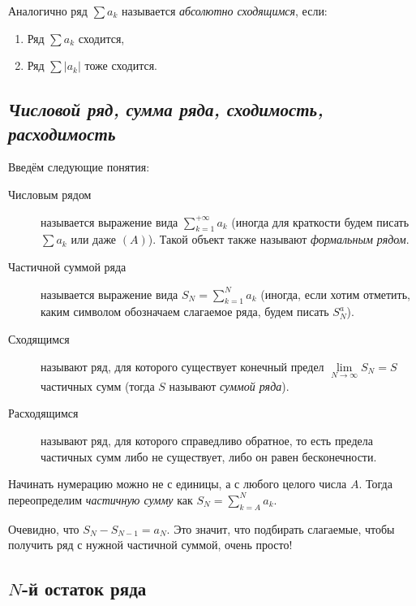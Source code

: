 \begin{ndefinition}
	Аналогично ряд \(\sum a_k\) называется \textit{абсолютно сходящимся}, если:
	\begin{enumerate}
		\item Ряд \(\sum a_k\) сходится,
		\item Ряд \(\sum |a_k|\) тоже сходится.
	\end{enumerate}
\end{ndefinition}

\subsection{\itshape Числовой ряд, сумма ряда, сходимость, расходимость}

\begin{definition}
	Введём следующие понятия:
	\begin{description}
		\item[Числовым рядом] называется выражение вида \(\sum\limits_{k=1}^{+\infty} a_k\) (иногда для краткости будем писать \(\sum a_k\) или даже \((A)\)). Такой объект также называют \textit{формальным рядом}.
		\item[Частичной суммой ряда] называется выражение вида \(S_N = \sum\limits_{k=1}^{N} a_k\) (иногда, если хотим отметить, каким символом обозначаем слагаемое ряда, будем писать \(S_N^a\)).
		\item[Сходящимся] называют ряд, для которого существует конечный предел \(\lim\limits_{N \to \infty} S_N = S\) частичных сумм (тогда \(S\) называют \textit{суммой ряда}).
		\item[Расходящимся] называют ряд, для которого справедливо обратное, то есть предела частичных сумм либо не существует, либо он равен бесконечности.
	\end{description}
\end{definition}

\begin{nremark}
	Начинать нумерацию можно не с единицы, а с любого целого числа \(A\). Тогда переопределим \textit{частичную сумму} как \(S_N = \sum\limits_{k=A}^{N} a_k\).
\end{nremark}

\begin{nremark}
	Очевидно, что \(S_N - S_{N-1} = a_N\). Это значит, что подбирать слагаемые, чтобы получить ряд с нужной частичной суммой, очень просто!
\end{nremark}

\subsection{\(N\)-й остаток ряда}

